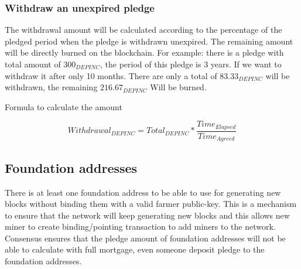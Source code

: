 \subsubsection{Withdraw an unexpired pledge}
\begin{flushleft}
    The withdrawal amount will be calculated according to the percentage of the pledged period when the pledge is withdrawn unexpired. The remaining amount will be directly burned on the blockchain. For example: there is a  pledge with total amount of $300_{DEPINC}$, the period of this pledge is 3 years. If we want to withdraw it after only 10 months. There are only a total of $83.33_{DEPINC}$ will be withdrawn, the remaining $216.67_{DEPINC}$ Will be burned.
\end{flushleft}
\begin{flushleft}
    Formula to calculate the amount
\end{flushleft}
\begin{equation}
    Withdrawal_{DEPINC} = Total_{DEPINC} * \frac{Time_{Elapsed}}{Time_{Agreed}}
\end{equation}
\subsection{Foundation addresses}
\begin{flushleft}
    There is at least one foundation address to be able to use for generating new blocks without binding them with a valid farmer public-key. This is a mechanism to ensure that the network will keep generating new blocks and this allows new miner to create binding/pointing transaction to add miners to the network. Consensus ensures that the pledge amount of foundation addresses will not be able to calculate with full mortgage, even someone deposit pledge to the foundation addresses.
\end{flushleft}
